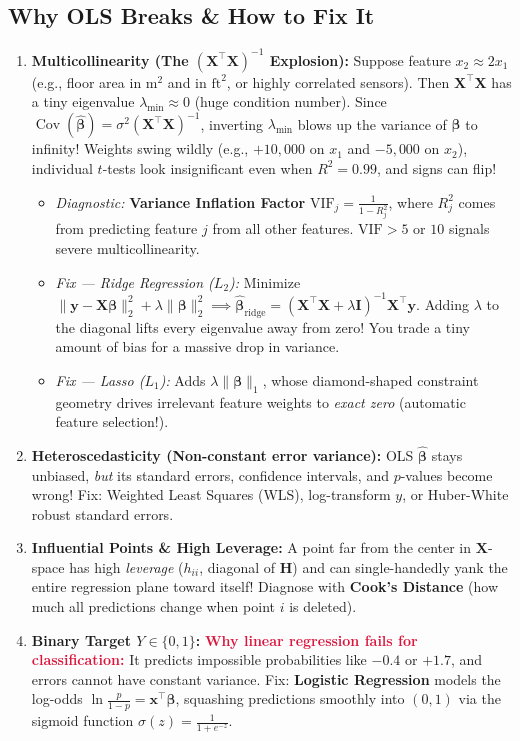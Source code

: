 \documentclass[11pt, a4paper]{article}
\begin{document}
\subsection{Why OLS Breaks \& How to Fix It}
\begin{enumerate}
    \item \textbf{Multicollinearity (The $(\mathbf{X}^\top\mathbf{X})^{-1}$ Explosion):} Suppose feature $x_2 \approx 2 x_1$ (e.g., floor area in $\text{m}^2$ and in $\text{ft}^2$, or highly correlated sensors). Then $\mathbf{X}^\top\mathbf{X}$ has a tiny eigenvalue $\lambda_{\min} \approx 0$ (huge condition number). Since $\operatorname{Cov}(\hat{\boldsymbol{\beta}}) = \sigma^2 (\mathbf{X}^\top\mathbf{X})^{-1}$, inverting $\lambda_{\min}$ blows up the variance of $\hat{\boldsymbol{\beta}}$ to infinity! Weights swing wildly (e.g., $+10{,}000$ on $x_1$ and $-5{,}000$ on $x_2$), individual $t$-tests look insignificant even when $R^2 = 0.99$, and signs can flip!
    \begin{itemize}
        \item \emph{Diagnostic:} \textbf{Variance Inflation Factor} $\text{VIF}_j = \frac{1}{1 - R_j^2}$, where $R_j^2$ comes from predicting feature $j$ from all other features. $\text{VIF} > 5$ or $10$ signals severe multicollinearity.
        \item \emph{Fix --- Ridge Regression ($L_2$):} Minimize $\|\mathbf{y} - \mathbf{X}\boldsymbol{\beta}\|_2^2 + \lambda \|\boldsymbol{\beta}\|_2^2 \implies \hat{\boldsymbol{\beta}}_{\text{ridge}} = (\mathbf{X}^\top\mathbf{X} + \lambda \mathbf{I})^{-1}\mathbf{X}^\top\mathbf{y}$. Adding $\lambda$ to the diagonal lifts every eigenvalue away from zero! You trade a tiny amount of bias for a massive drop in variance.
        \item \emph{Fix --- Lasso ($L_1$):} Adds $\lambda \|\boldsymbol{\beta}\|_1$, whose diamond-shaped constraint geometry drives irrelevant feature weights to \emph{exact zero} (automatic feature selection!).
    \end{itemize}
    \item \textbf{Heteroscedasticity (Non-constant error variance):} OLS $\hat{\boldsymbol{\beta}}$ stays unbiased, \emph{but} its standard errors, confidence intervals, and $p$-values become wrong! Fix: Weighted Least Squares (WLS), log-transform $y$, or Huber-White robust standard errors.
    \item \textbf{Influential Points \& High Leverage:} A point far from the center in $\mathbf{X}$-space has high \emph{leverage} ($h_{ii}$, diagonal of $\mathbf{H}$) and can single-handedly yank the entire regression plane toward itself! Diagnose with \textbf{Cook's Distance} (how much all predictions change when point $i$ is deleted).
    \item \textbf{Binary Target $Y \in \{0,1\}$:} \textcolor{crimson}{\textbf{Why linear regression fails for classification:}} It predicts impossible probabilities like $-0.4$ or $+1.7$, and errors cannot have constant variance. Fix: \textbf{Logistic Regression} models the log-odds $\ln\frac{p}{1-p} = \mathbf{x}^\top\boldsymbol{\beta}$, squashing predictions smoothly into $(0,1)$ via the sigmoid function $\sigma(z) = \frac{1}{1+e^{-z}}$.
\end{enumerate}
\end{document}
